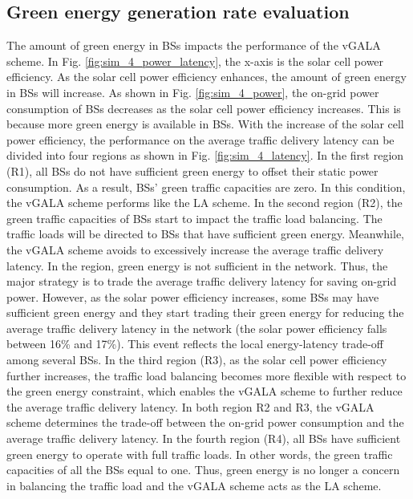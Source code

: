 \documentclass[journal]{IEEEtran}
\theoremstyle{definition}
\begin{document}
\subsection{Green energy generation rate evaluation}
The amount of green energy in BSs impacts the performance of the vGALA scheme. In Fig. \ref{fig:sim_4_power_latency}, the x-axis is the solar cell power efficiency. As the solar cell power efficiency enhances, the amount of green energy in BSs will increase. As shown in Fig. \ref{fig:sim_4_power}, the on-grid power consumption of BSs decreases as the solar cell power efficiency increases. This is because more green energy is available in BSs. With the increase of the solar cell power efficiency, the performance on the average traffic delivery latency can be divided into four regions as shown in Fig. \ref{fig:sim_4_latency}. In the first region (R1), all BSs do not have sufficient green energy to offset their static power consumption. As a result, BSs' green traffic capacities are zero. In this condition, the vGALA scheme performs like the LA scheme. In the second region (R2), the green traffic capacities of BSs start to impact the traffic load balancing. The traffic loads will be directed to BSs that have sufficient green energy. Meanwhile, the vGALA scheme avoids to excessively increase the average traffic delivery latency. In the region, green energy is not sufficient in the network. Thus, the major strategy is to trade the average traffic delivery latency for saving on-grid power. However, as the solar power efficiency increases, some BSs may have sufficient green energy and they start trading their green energy for reducing the average traffic delivery latency in the network (the solar power efficiency falls between 16\% and 17\%). This event reflects the local energy-latency trade-off among several BSs. In the third region (R3), as the solar cell power efficiency further increases, the traffic load balancing becomes more flexible with respect to the green energy constraint, which enables the vGALA scheme to further reduce the average traffic delivery latency. In both region R2 and R3, the vGALA scheme determines the trade-off between the on-grid power consumption and the average traffic delivery latency. In the fourth region (R4), all BSs have sufficient green energy to operate with full traffic loads. In other words, the green traffic capacities of all the BSs equal to one. Thus, green energy is no longer a concern in balancing the traffic load and the vGALA scheme acts as the LA scheme.
\end{document}
